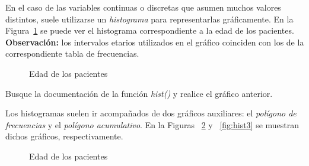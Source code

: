 \documentclass{prob}
\begin{document}
	\begin{problema}
	En el caso de las variables continuas o discretas que asumen muchos valores distintos, suele utilizarse un \textit{histograma} para representarlas gráficamente. En la Figura~\ref{fig:hist} se puede ver el histograma correspondiente a la edad de los pacientes. \\
	\textbf{Observación:} los intervalos etarios utilizados en el gráfico coinciden con los de la correspondiente tabla de frecuencias.
\begin{figure}[!ht]
    \centering
    
    \caption{Edad de los pacientes}
    \label{fig:hist}
\end{figure}		
	
	\begin{parte}
	Busque la documentación de la función \textit{hist()} y realice el gráfico anterior.\\
	
	\noindent{}
	\end{parte}	
	
	\begin{parte}
	Los histogramas suelen ir acompañados de dos gráficos auxiliares: el \textit{polígono de frecuencias} y el \textit{polígono acumulativo}. En la Figuras ~\ref{fig:hist2} y ~\ref{fig:hist3} se muestran dichos gráficos, respectivamente.

\begin{figure}[!ht]
    \centering
    
    \caption{Edad de los pacientes}
    \label{fig:hist2}
\end{figure}	


\end{parte}
\end{problema}
\end{document}
